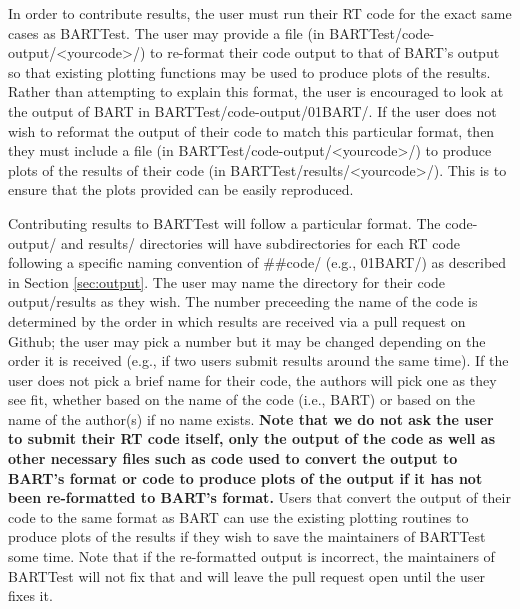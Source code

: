 \documentclass[letterpaper, 12pt]{article}
\begin{document}
In order to contribute results, the user must run their RT code for the exact 
same cases as BARTTest. The user may provide a file 
(in BARTTest/code-output/{\textless}yourcode{\textgreater}/) to re-format 
their code output to that of BART's output so that existing plotting functions 
may be used to produce plots of the results. Rather than attempting 
to explain this format, the user is encouraged to look at the output of BART 
in BARTTest/code-output/01BART/. If the user does not wish to reformat the 
output of their code to match this particular format, then they must include a 
file (in BARTTest/code-output/{\textless}yourcode{\textgreater}/) to produce 
plots of the results of their code 
(in BARTTest/results/{\textless}yourcode{\textgreater}/). 
This is to ensure that the plots provided can be easily reproduced.

Contributing results to BARTTest will follow a particular format. The 
code-output/ and results/ directories will have subdirectories for each RT 
code following a specific naming convention of {\#}{\#}code/ (e.g., 01BART/) as 
described in Section \ref{sec:output}. The user may name the directory for 
their code output/results as they wish. The number 
preceeding the name of the code is determined by the order 
in which results are received via a pull request on Github; the user may pick 
a number but it may be changed depending on the order it is received (e.g., if 
two users submit results around the same time). If the user does not pick 
a brief name for their code, the authors will pick one as they see fit, 
whether based on the name of the code (i.e., BART) or based on the name of 
the author(s) if no name exists. \textbf{Note that we do not ask the user 
to submit their RT code itself, only the output of the code as well as other 
necessary files such as code used to convert the output to BART's format or 
code to produce plots of the output if it has not been re-formatted to 
BART's format.} Users that convert the output of their code to the same format 
as BART can use the existing plotting routines to produce plots of the 
results if they wish to save the maintainers of BARTTest some time. Note that 
if the re-formatted output is incorrect, the maintainers of BARTTest will not 
fix that and will leave the pull request open until the user fixes it.
\end{document}
